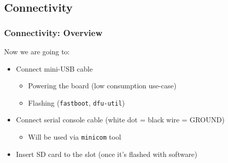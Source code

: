 \subsection{Connectivity}

\begin{frame}
  \frametitle{Connectivity: Overview}

  \alert{Now we are going to:}

  \begin{itemize}
  \item Connect mini-USB cable
    \begin{itemize}
    \item Powering the board (low consumption use-case)
    \item Flashing (\texttt{fastboot}, \texttt{dfu-util})
    \end{itemize}
  \item Connect serial console cable (white dot = black wire = GROUND)
    \begin{itemize}
    \item Will be used via \texttt{minicom} tool
    \end{itemize}
  \item Insert SD card to the slot (once it's flashed with software)
  \end{itemize}
\end{frame}

